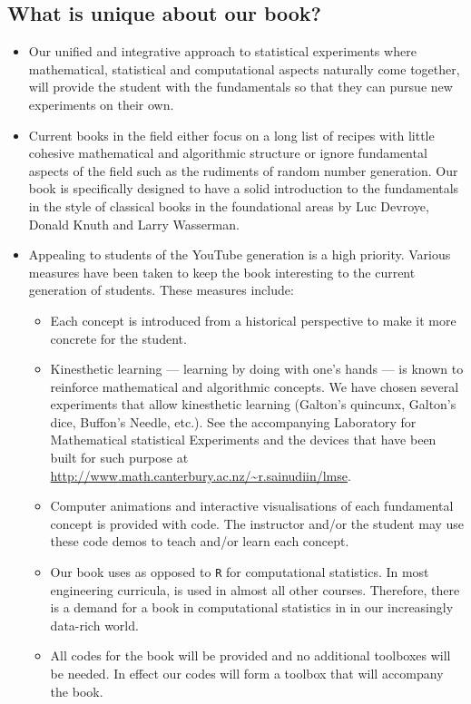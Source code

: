 \subsection*{What is unique about our book?}

\begin{itemize}
\item Our unified and integrative approach to statistical experiments where mathematical, statistical and computational aspects naturally come together, will provide the student with the fundamentals so that they can pursue new experiments on their own.
\item Current books in the field either focus on a long list of recipes with little cohesive mathematical and algorithmic structure or ignore fundamental aspects of the field such as the rudiments of random number generation.  Our book is specifically designed to have a solid introduction to the fundamentals in the style of classical books in the foundational areas by Luc Devroye, Donald Knuth and Larry Wasserman.
\item Appealing to students of the YouTube generation is a high priority.  Various measures have been taken to keep the book interesting to the current generation of students.  These measures include:
\begin{itemize}
\item Each concept is introduced from a historical perspective to make it more concrete for the student.
\item Kinesthetic learning --- learning by doing with one's hands --- is known to reinforce mathematical and algorithmic concepts.  We have chosen several experiments that allow kinesthetic learning (Galton's quincunx, Galton's dice, Buffon's Needle, etc.).  See the accompanying Laboratory for Mathematical statistical Experiments and the devices that have been built for such purpose at \url{http://www.math.canterbury.ac.nz/~r.sainudiin/lmse}.
\item Computer animations and interactive visualisations of each fundamental concept is provided with \Matlab code.  The instructor and/or the student may use these code demos to teach and/or learn each concept.
\item Our book uses \Matlab as opposed to {\tt R} for computational statistics.  In most engineering curricula, \Matlab is used in almost all other courses.  Therefore, there is a demand for a book in computational statistics in \Matlab in our increasingly data-rich world.
\item All codes for the book will be provided and no additional toolboxes will be needed.  In effect our codes will form a toolbox that will accompany the book.

\end{itemize}
\end{itemize}
